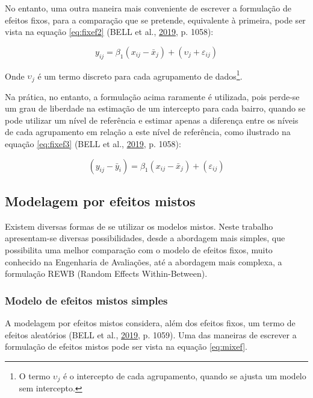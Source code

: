 \documentclass[
  a4paper, 11pt]{article}
\begin{document}
No entanto, uma outra maneira mais conveniente de escrever a formulação
de efeitos fixos, para a comparação que se pretende, equivalente à
primeira, pode ser vista na equação \ref{eq:fixef2} (BELL et al.,
\protect\hyperlink{ref-bell2019}{2019}, p. 1058):

\begin{equation} \label{eq:fixef2}
y_{ij} = \beta_1 (x_{ij} - \bar{x}_j) + (\upsilon_j + \varepsilon_{ij}) 
\end{equation}

Onde \(\upsilon_j\) é um termo discreto para cada agrupamento de
dados\footnote{O termo \(\upsilon_j\) é o intercepto de cada
  agrupamento, quando se ajusta um modelo sem intercepto.}.

Na prática, no entanto, a formulação acima raramente é utilizada, pois
perde-se um grau de liberdade na estimação de um intercepto para cada
bairro, quando se pode utilizar um nível de referência e estimar apenas
a diferença entre os níveis de cada agrupamento em relação a este nível
de referência, como ilustrado na equação \ref{eq:fixef3} (BELL et al.,
\protect\hyperlink{ref-bell2019}{2019}, p. 1058):

\begin{equation} \label{eq:fixef3}
(y_{ij} - \bar{y}_i) = \beta_1 (x_{ij} - \bar{x}_j) + (\varepsilon_{ij}) 
\end{equation}

\hypertarget{modelagem-por-efeitos-mistos}{%
\subsection{Modelagem por efeitos
mistos}\label{modelagem-por-efeitos-mistos}}

Existem diversas formas de se utilizar os modelos mistos. Neste trabalho
apresentam-se diversas possibilidades, desde a abordagem mais simples,
que possibilita uma melhor comparação com o modelo de efeitos fixos,
muito conhecido na Engenharia de Avaliações, até a abordagem mais
complexa, a formulação REWB (Random Effects Within-Between).

\hypertarget{modelo-de-efeitos-mistos-simples}{%
\subsubsection{Modelo de efeitos mistos
simples}\label{modelo-de-efeitos-mistos-simples}}

A modelagem por efeitos mistos considera, além dos efeitos fixos, um
termo de efeitos aleatórios (BELL et al.,
\protect\hyperlink{ref-bell2019}{2019}, p. 1059). Uma das maneiras de
escrever a formulação de efeitos mistos pode ser vista na equação
\ref{eq:mixef}.
\end{document}
